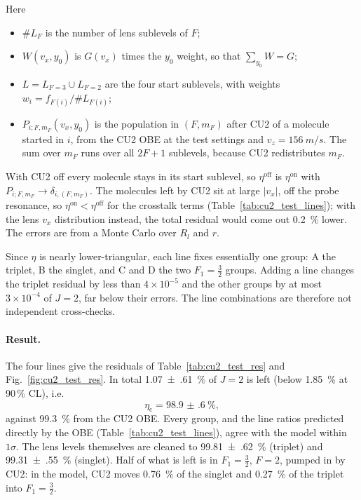 \documentclass[11pt,a4paper,oneside]{report}
\newcommand{\etac}{\eta_{\mathrm{c}}}
\begin{document}
Here
\begin{itemize}[itemsep=0pt]
  \item $\#L_F$ is the number of lens sublevels of $F$;
  \item $W(v_x,y_0)$ is $G(v_x)$ times the $y_0$ weight, so that $\sum_{y_0}W=G$;
  \item $L=L_{F=3}\cup L_{F=2}$ are the four start sublevels, with weights $w_i=f_{F(i)}/\#L_{F(i)}$;
  \item $P_{i;F,m_F}(v_x,y_0)$ is the population in $(F,m_F)$ after CU2 of a molecule started in $i$,
        from the CU2 OBE at the test settings and $v_z=\SI{156}{m/s}$. The sum over $m_F$ runs over
        all $2F+1$ sublevels, because CU2 redistributes $m_F$.
\end{itemize}
With CU2 off every molecule stays in its start sublevel, so $\eta^{\mathrm{off}}$ is
$\eta^{\mathrm{on}}$ with $P_{i;F,m_F}\to\delta_{i,(F,m_F)}$. The molecules left by CU2 sit at large $|v_x|$, off the
probe resonance, so $\eta^{\mathrm{on}}<\eta^{\mathrm{off}}$ for the crosstalk terms
(Table~\ref{tab:cu2_test_lines}); with the lens $v_x$ distribution instead, the total residual would
come out \SI{0.2}{\percent} lower. The errors are from a Monte Carlo over $R_l$ and $r$.

Since $\eta$ is nearly lower-triangular, each line fixes essentially one group: A the triplet, B the
singlet, and C and D the two $F_1=\tfrac32$ groups. Adding a line changes the triplet residual by
less than $4\times10^{-5}$ and the other groups by at most $3\times10^{-4}$ of $J=2$, far below their
errors. The line combinations are therefore not independent cross-checks.

\paragraph{Result.} The four lines give the residuals of Table~\ref{tab:cu2_test_res} and
Fig.~\ref{fig:cu2_test_res}. In total \SI{1.07(61)}{\percent} of $J=2$ is left (below \SI{1.85}{\percent}
at 90\,\% CL), i.e.
\begin{equation*}
  \etac=\SI{98.9(6)}{\percent},
\end{equation*}
against \SI{99.3}{\percent} from the CU2 OBE. Every group, and the line ratios predicted directly by
the OBE (Table~\ref{tab:cu2_test_lines}), agree with the model within $1\sigma$. The lens levels
themselves are cleaned to \SI{99.81(62)}{\percent} (triplet) and \SI{99.31(55)}{\percent} (singlet).
Half of what is left is in $F_1=\tfrac32$, $F=2$, pumped in by CU2: in the model, CU2 moves
\SI{0.76}{\percent} of the singlet and \SI{0.27}{\percent} of the triplet into $F_1=\tfrac32$.
\end{document}

